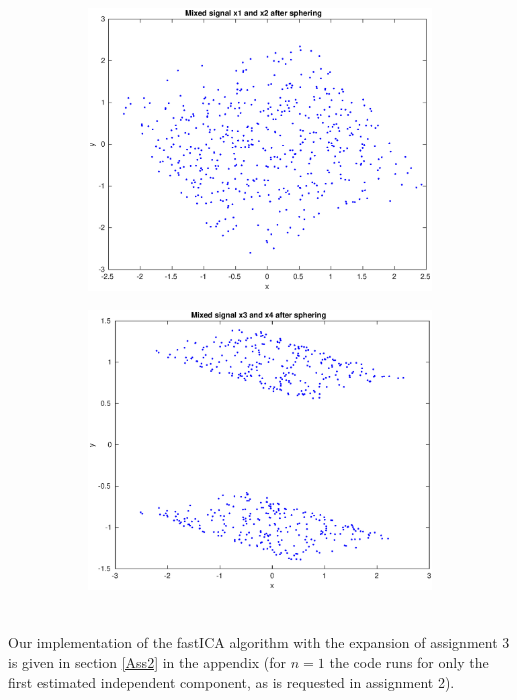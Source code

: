 \documentclass[10pt]{article}
\begin{document}
\begin{figure}[H]
\begin{subfigure}[b]{.49\textwidth}
		\includegraphics[width=\columnwidth]{Ass1c.eps}
		\caption{}
		\label{fig1c}
	\end{subfigure}  
	\begin{subfigure}[b]{.49\textwidth}
		\includegraphics[width=\columnwidth]{Ass1d.eps}
		\caption{}
		\label{fig1d}
	\end{subfigure}
  \label{fig1.1}
\end{figure}

\section{}
Our implementation of the fastICA algorithm with the expansion of assignment 3 is given in section \ref{Ass2} in the appendix (for $n=1$ the code runs for only the first estimated independent component, as is requested in assignment 2).
\end{document}
